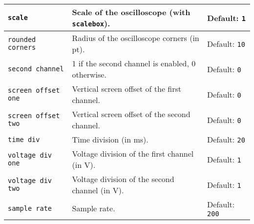 \documentclass[11pt,a4paper,usenames,dvipsnames]{article}
\begin{document}
\begin{tcolorbox}[enhanced,breakable,colback=white,colframe=black,width=\textwidth,left=0mm,right=0mm,top=0mm,bottom=0mm,boxsep=0mm]
    \begin{tabular}{p{}|p{}|p{}}
        \texttt{scale}                 & Scale of the oscilloscope (with \texttt{scalebox}).                                                                    & Default: \texttt{1}                                             \\\hline
        \texttt{rounded corners}       & Radius of the oscilloscope corners (in pt).                                                                            & Default: \texttt{10}                                            \\\hline
        \texttt{second channel}        & 1 if the second channel is enabled, 0 otherwise.                                                                       & Default: \texttt{0}                                             \\\hline
        \texttt{screen offset one}     & Vertical screen offset of the first channel.                                                                           & Default: \texttt{0}                                             \\\hline
        \texttt{screen offset two}     & Vertical screen offset of the second channel.                                                                          & Default: \texttt{0}                                             \\\hline
        \texttt{time div}              & Time division (in ms).                                                                                                 & Default: \texttt{20}                                            \\\hline
        \texttt{voltage div one}       & Voltage division of the first channel (in V).                                                                          & Default: \texttt{1}                                             \\\hline
        \texttt{voltage div two}       & Voltage division of the second channel (in V).                                                                         & Default: \texttt{1}                                             \\\hline
        \texttt{sample rate}           & Sample rate.                                                                                                           & Default: \texttt{200}                                           \\\hline

\end{tabular}
\end{tcolorbox}
\end{document}
